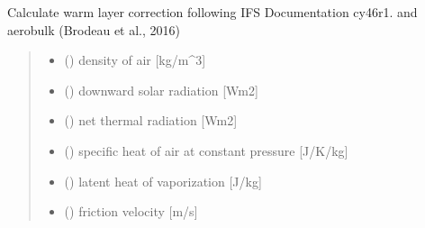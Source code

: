 \documentclass[letterpaper,10pt,english]{sphinxmanual}
\begin{document}
\begin{fulllineitems}
\label{\detokenize{users_guide:AirSeaFluxCode.cs_wl_subs.wl_ecmwf}}
\pysigstartsignatures
\pysiglinewithargsret
{}
{\sphinxparamcomma {}\sphinxparamcomma {}\sphinxparamcomma {}\sphinxparamcomma {}\sphinxparamcomma {}\sphinxparamcomma {}\sphinxparamcomma {}\sphinxparamcomma {}\sphinxparamcomma {}\sphinxparamcomma {}\sphinxparamcomma {}}
{}
\pysigstopsignatures
\sphinxAtStartPar
Calculate warm layer correction following IFS Documentation cy46r1.
and aerobulk (Brodeau et al., 2016)
\begin{quote}\begin{description}
\begin{itemize}
\item {}
\sphinxAtStartPar
{} () \textendash{} density of air               {[}kg/m\textasciicircum{}3{]}

\item {}
\sphinxAtStartPar
{} () \textendash{} downward solar radiation    {[}Wm\sphinxhyphen{}2{]}

\item {}
\sphinxAtStartPar
{} () \textendash{} net thermal radiation  {[}Wm\sphinxhyphen{}2{]}

\item {}
\sphinxAtStartPar
{} () \textendash{} specific heat of air at constant pressure {[}J/K/kg{]}

\item {}
\sphinxAtStartPar
{} () \textendash{} latent heat of vaporization   {[}J/kg{]}

\item {}
\sphinxAtStartPar
{} () \textendash{} friction velocity           {[}m/s{]}


\end{itemize}
\end{description}
\end{quote}
\end{fulllineitems}
\end{document}

